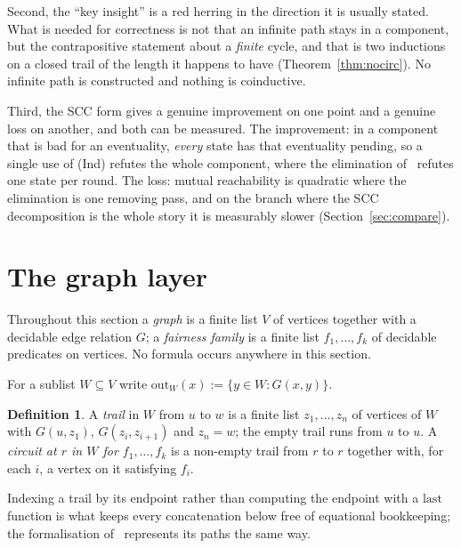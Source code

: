 \documentclass[11pt,a4paper]{article}
\theoremstyle{definition}
\newtheorem{definition}[theorem]{Definition}
\newcommand{\outs}{\mathrm{out}}
\begin{document}
Second, the ``key insight'' is a red herring in the direction it is usually
stated.  What is needed for correctness is not that an infinite path stays in a
component, but the contrapositive statement about a \emph{finite} cycle, and
that is two inductions on a closed trail of the length it happens to have
(Theorem~\ref{thm:nocirc}).  No infinite path is constructed and nothing is
coinductive.

Third, the SCC form gives a genuine improvement on one point and a genuine loss
on another, and both can be measured.  The improvement: in a component that is
bad for an eventuality, \emph{every} state has that eventuality pending, so a
single use of (Ind) refutes the whole component, where the elimination
of~\cite{m4} refutes one state per round.  The loss: mutual reachability is
quadratic where the elimination is one removing pass, and on the branch where
the SCC decomposition is the whole story it is measurably slower
(Section~\ref{sec:compare}).

\section{The graph layer}\label{sec:graph}

Throughout this section a \emph{graph} is a finite list $V$ of vertices
together with a decidable edge relation $G$; a \emph{fairness family} is a
finite list $f_1,\dots,f_k$ of decidable predicates on vertices.  No formula
occurs anywhere in this section.

For a sublist $W\subseteq V$ write $\outs_W(x):=\{y\in W: G(x,y)\}$.

\begin{definition}
A \emph{trail} in $W$ from $u$ to $w$ is a finite list $z_1,\dots,z_n$ of
vertices of $W$ with $G(u,z_1)$, $G(z_i,z_{i+1})$ and $z_n=w$; the empty trail
runs from $u$ to $u$.  A \emph{circuit at $r$ in $W$ for $f_1,\dots,f_k$} is a
non-empty trail from $r$ to $r$ together with, for each $i$, a vertex on it
satisfying $f_i$.
\end{definition}

Indexing a trail by its endpoint rather than computing the endpoint with a
$\mathrm{last}$ function is what keeps every concatenation below free of
equational bookkeeping; the formalisation of~\cite{m4} represents its paths
the same way.
\end{document}
